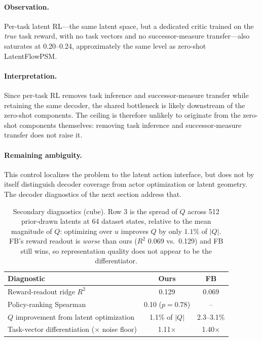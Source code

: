 \documentclass{article}
\begin{document}
\paragraph{Observation.} Per-task latent RL---the same latent space, but a dedicated critic trained on the \emph{true} task reward, with no task vectors and no successor-measure transfer---also saturates at 0.20--0.24, approximately the same level as zero-shot LatentFlowPSM.

\paragraph{Interpretation.} Since per-task RL removes task inference and successor-measure transfer while retaining the same decoder, the shared bottleneck is likely downstream of the zero-shot components. The ceiling is therefore unlikely to originate from the zero-shot components themselves: removing task inference and successor-measure transfer does not raise it.

\paragraph{Remaining ambiguity.} This control localizes the problem to the latent action interface, but does not by itself distinguish decoder coverage from actor optimization or latent geometry. The decoder diagnostics of the next section address that.

\begin{table}[h]
\centering
\small
\begin{tabular}{@{}lcc@{}}
\toprule
Diagnostic & Ours & FB \\
\midrule
Reward-readout ridge $R^2$ & 0.129 & 0.069 \\
Policy-ranking Spearman & 0.10 ($p=0.78$) & -- \\
$Q$ improvement from latent optimization & 1.1\% of $|Q|$ & 2.3--3.1\% \\
Task-vector differentiation ($\times$ noise floor) & 1.11$\times$ & 1.40$\times$ \\
\bottomrule
\end{tabular}
\caption{Secondary diagnostics (cube). Row 3 is the spread of $Q$ across 512 prior-drawn latents at 64 dataset states, relative to the mean magnitude of $Q$: optimizing over $u$ improves $Q$ by only $1.1\%$ of $|Q|$. FB's reward readout is \emph{worse} than ours ($R^2$ 0.069 vs.\ 0.129) and FB still wins, so representation quality does not appear to be the differentiator.}
\label{tab:diag}
\end{table}
\end{document}
